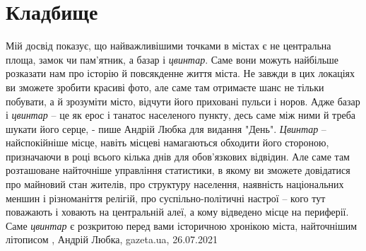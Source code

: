  
 
 
 
 
\chapter{Кладбище}

Мій досвід показує, що найважливішими точками в містах є не центральна площа,
замок чи пам'ятник, а базар і \emph{цвинтар}. Саме вони можуть найбільше розказати нам
про історію й повсякденне життя міста. Не завжди в цих локаціях ви зможете
зробити красиві фото, але саме там отримаєте шанс не тільки побувати, а й
зрозуміти місто, відчути його приховані пульси і норов. Адже базар і \emph{цвинтар} –
це як ерос і танатос населеного пункту, десь саме між ними й треба шукати його
серце, - пише Андрій Любка для видання "День".
\emph{Цвинтар} – найспокійніше місце, навіть місцеві намагаються обходити його
стороною, призначаючи в році всього кілька днів для обов'язкових відвідин. Але
саме там розташоване найточніше управління статистики, в якому ви зможете
довідатися про майновий стан жителів, про структуру населення, наявність
національних меншин і різноманіття релігій, про суспільно-політичні настрої –
кого тут поважають і ховають на центральній алеї, а кому відведено місце на
периферії. Саме \emph{цвинтар} є розкритою перед вами історичною хронікою міста,
найточнішим літописом
, 
Андрій Любка, gazeta.ua, 26.07.2021
